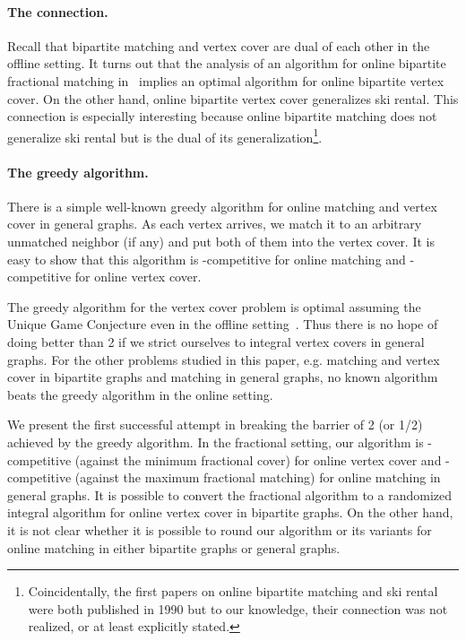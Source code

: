 \documentclass{article}
\begin{document}
\paragraph{The connection.}
Recall that bipartite matching and vertex cover are dual of each other in the offline setting. It turns out that the analysis of an algorithm for online bipartite fractional matching in~\cite{Buchbinder2007} implies an optimal algorithm for online bipartite vertex cover. On the other hand, online bipartite vertex cover generalizes ski rental. This connection is especially interesting because online bipartite matching does not generalize ski rental but is the dual of its generalization\footnote{Coincidentally, the first papers on online bipartite matching and ski rental were both published in 1990 but to our knowledge, their connection was not realized, or at least explicitly stated.}.

\paragraph{The greedy algorithm.}
There is a simple well-known greedy algorithm for online matching and vertex cover in general graphs. As each vertex arrives, we match it to an arbitrary unmatched neighbor (if any) and put both of them into the vertex cover. It is easy to show that this algorithm is -competitive for online matching and -competitive for online vertex cover.

The greedy algorithm for the vertex cover problem is optimal assuming the Unique Game Conjecture even in the offline setting~\cite{Khot2008}. Thus there is no hope of doing better than 2 if we strict ourselves to integral vertex covers in general graphs.  For the other problems studied in this paper, e.g. matching and vertex cover in bipartite graphs and matching in general graphs, no known algorithm beats the greedy algorithm in the online setting.

We present the first successful attempt in breaking the barrier of 2 (or 1/2) achieved by the greedy algorithm. In the fractional setting, our algorithm is -competitive (against the minimum fractional cover) for online vertex cover and -competitive (against the maximum fractional matching) for online matching in general graphs. It is possible to convert the fractional algorithm to a randomized integral algorithm for online vertex cover in bipartite graphs. On the other hand, it is not clear whether it is possible to round our algorithm or its variants for online matching in either bipartite graphs or general graphs.
\end{document}
